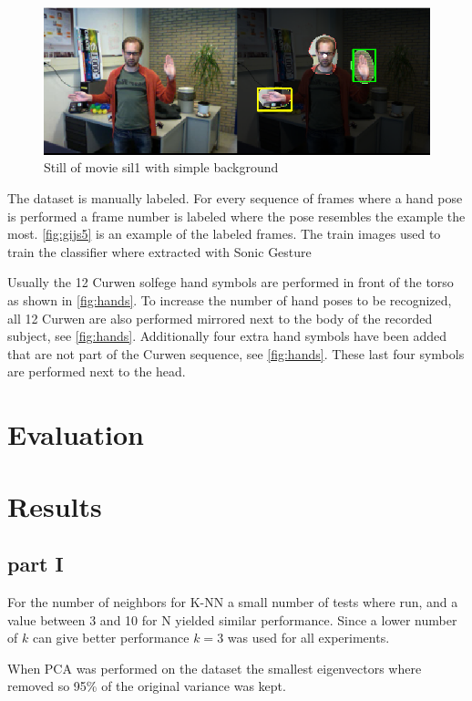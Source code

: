 \begin{figure}[htbp]
\center{}
\includegraphics[width=0.8\linewidth]{figures/complex.png}
\caption{Still of movie sil1 with simple background}
\label{fig:complexbackground}
\end{figure}


The dataset is manually labeled. For every sequence of frames where a hand pose is performed a frame number is labeled where the pose resembles the example the most. \autoref{fig:gijs5} is an example of the labeled frames. The train images used to train the classifier where extracted with Sonic Gesture

Usually the 12 Curwen solfege hand symbols are performed in front of the torso as shown in \autoref{fig:hands}. To increase the number of hand poses to be recognized, all 12 Curwen are also performed mirrored next to the body of the recorded subject, see \autoref{fig:hands}. Additionally four extra hand symbols have been added that are not part of the Curwen sequence, see \autoref{fig:hands}. These last four symbols are performed next to the head.

\section{Evaluation}


\section{Results}

\subsection{part I}
For the number of neighbors for K-NN a small number of tests where run, and a value between 3 and 10 for N yielded similar performance. Since a lower number of $k$ can give better performance $k=3$ was used for all experiments.

When PCA was performed on the dataset the smallest eigenvectors where removed so 95\% of the original variance was kept.

